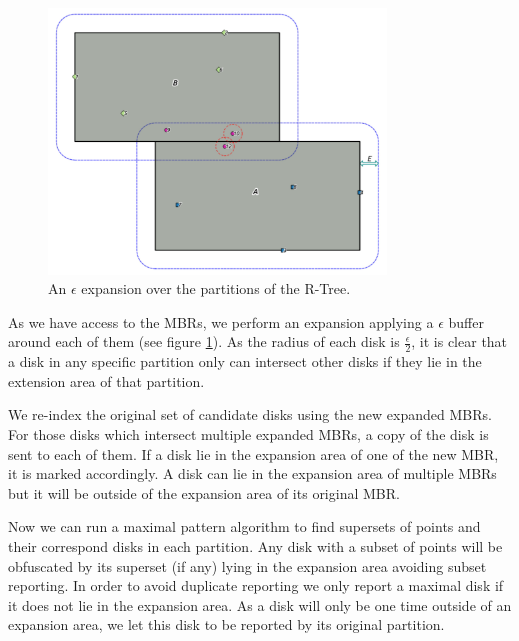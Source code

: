 \documentclass[12pt]{scrartcl}
\begin{document}
\begin{figure}
	\centering
	\begin{center}
	\includegraphics[width=0.8\textwidth]{./Figures/expansion}
\end{center}
	\caption{An $\epsilon$ expansion over the partitions of the R-Tree.}
	\label{fig:expansion}
\end{figure}

As we have access to the MBRs, we perform an expansion applying a $\epsilon$ buffer around each of them (see figure \ref{fig:expansion}). As the radius of each disk is $\frac{\epsilon}{2}$, it is clear that a disk in any specific partition only can intersect other disks if they lie in the extension area of that partition.  

We re-index the original set of candidate disks using the new expanded MBRs.  For those disks which intersect multiple expanded MBRs, a copy of the disk is sent to each of them. If a disk lie in the expansion area of one of the new MBR, it is marked accordingly. A disk can lie in the expansion area of multiple MBRs but it will be outside of the expansion area of its original MBR. 

Now we can run a maximal pattern algorithm to find supersets of points and their correspond disks in each partition. Any disk with a subset of points will be obfuscated by its superset (if any) lying in the expansion area avoiding subset reporting.  In order to avoid duplicate reporting we only report a maximal disk if it does not lie in the expansion area. As a disk will only be one time outside of an expansion area, we let this disk to be reported by its original partition.
\end{document}
